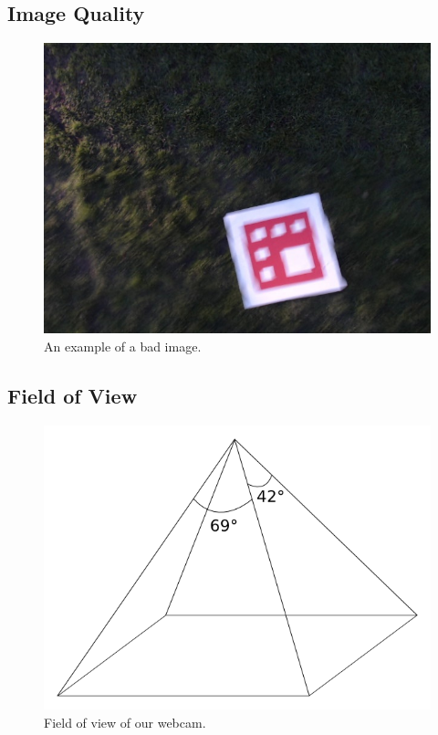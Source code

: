 \documentclass[10pt]{scrartcl} %
\begin{document}
\subsection{Image Quality}

\begin{figure}[h]
    \centering
    \includegraphics[width=\textwidth]{images/badimage.jpg}
    \caption{An example of a bad image.}
    \label{fig:badimage}
\end{figure}

\subsection{Field of View}



\begin{figure}[h]
    \centering
    \includegraphics[width=\textwidth]{images/fov.png}
    \caption{Field of view of our webcam.}
    \label{fig:fov}
\end{figure}
\end{document}
